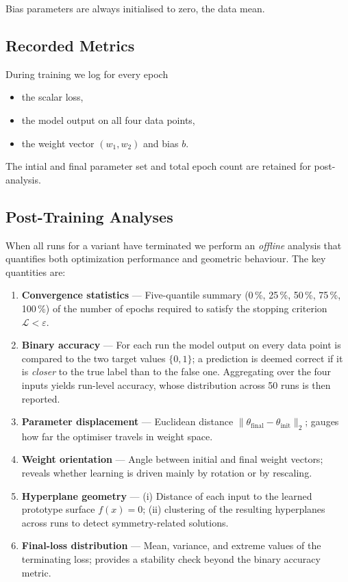 Bias parameters are always initialised to zero, the data mean.

\subsection*{Recorded Metrics}

During training we log for every epoch
\begin{itemize}
  \item the scalar loss,
  \item the model output on all four data points,
  \item the weight vector \((w_1,w_2)\) and bias \(b\).
\end{itemize}
The intial and final parameter set and total epoch count are retained for post-analysis.

\subsection*{Post-Training Analyses}

When all runs for a variant have terminated we perform an \emph{offline}
analysis that quantifies both optimization performance and geometric
behaviour.  The key quantities are:

\begin{enumerate}[label=(A\arabic*)]
    \item \textbf{Convergence statistics} —  
          Five-quantile summary (0\,\%, 25\,\%, 50\,\%, 75\,\%, 100\,\%) of
          the number of epochs required to satisfy the stopping criterion
          \(\mathcal{L}<\varepsilon\).
    \item \textbf{Binary accuracy} —  
          For each run the model output on every data point is compared to the
          two target values \(\{0,1\}\); a prediction is deemed correct if it
          is \emph{closer} to the true label than to the false one.
          Aggregating over the four inputs yields run-level accuracy, whose
          distribution across 50 runs is then reported.
    \item \textbf{Parameter displacement} —  
          Euclidean distance
          \(\lVert\theta_{\text{final}}-\theta_{\text{init}}\rVert_2\); gauges
          how far the optimiser travels in weight space.
    \item \textbf{Weight orientation} —  
          Angle between initial and final weight vectors; reveals whether
          learning is driven mainly by rotation or by rescaling.
    \item \textbf{Hyperplane geometry} —  
          (i) Distance of each input to the learned prototype surface
          \(f(x)=0\);  
          (ii) clustering of the resulting hyperplanes across runs to detect
          symmetry-related solutions.
    \item \textbf{Final-loss distribution} —  
          Mean, variance, and extreme values of the terminating loss; provides
          a stability check beyond the binary accuracy metric.
\end{enumerate}

